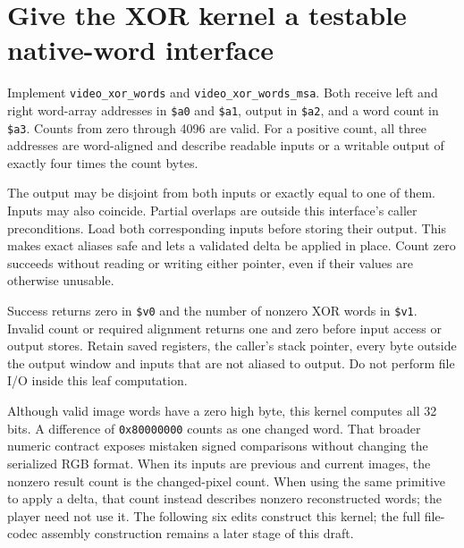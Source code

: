 \section{Give the XOR kernel a testable native-word interface}
Implement \texttt{video\_xor\_words} and \texttt{video\_xor\_words\_msa}. Both receive
left and right word-array addresses in \texttt{\$a0} and \texttt{\$a1}, output in
\texttt{\$a2}, and a word count in \texttt{\$a3}. Counts from zero through 4096 are
valid. For a positive count, all three addresses are word-aligned and describe
readable inputs or a writable output of exactly four times the count bytes.

The output may be disjoint from both inputs or exactly equal to one of them. Inputs
may also coincide. Partial overlaps are outside this interface's caller preconditions.
Load both corresponding inputs before storing their output. This makes exact aliases
safe and lets a validated delta be applied in place. Count zero succeeds without
reading or writing either pointer, even if their values are otherwise unusable.

Success returns zero in \texttt{\$v0} and the number of nonzero XOR words in
\texttt{\$v1}. Invalid count or required alignment returns one and zero before input
access or output stores. Retain saved registers, the caller's stack pointer, every
byte outside the output window and inputs that are not aliased to output. Do not
perform file I/O inside this leaf computation.

Although valid image words have a zero high byte, this kernel computes all 32 bits.
A difference of \texttt{0x80000000} counts as one changed word. That broader numeric
contract exposes mistaken signed comparisons without changing the serialized RGB
format. When its inputs are previous and current images, the nonzero result count is the
changed-pixel count. When using the same primitive to apply a delta, that count
instead describes nonzero reconstructed words; the player need not use it.
The following six edits construct this kernel; the full file-codec assembly
construction remains a later stage of this draft.
